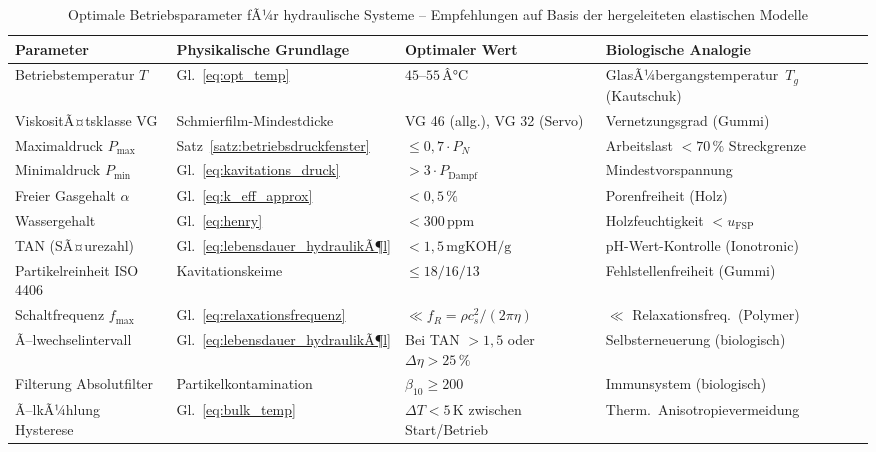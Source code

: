 ﻿\documentclass[a4paper,12pt]{scrreprt}
\theoremstyle{definition}
\begin{document}
\begin{table}[H]
  \centering
  \caption{Optimale Betriebsparameter fÃ¼r hydraulische Systeme -- Empfehlungen
    auf Basis der hergeleiteten elastischen Modelle}
  \label{tab:optimale_parameter}
  \begin{tabular}{p{4.5cm}p{3.5cm}p{3.0cm}p{2.5cm}}
    \toprule
    \textbf{Parameter}
      & \textbf{Physikalische Grundlage}
      & \textbf{Optimaler Wert}
      & \textbf{Biologische Analogie} \\
    \midrule
    Betriebstemperatur $T$
      & Gl.~\eqref{eq:opt_temp}
      & $45$--$55\,Â°\mathrm{C}$
      & GlasÃ¼bergangs\-temperatur\ $T_g$ (Kautschuk) \\[4pt]
    ViskositÃ¤tsklasse VG
      & Schmierfilm-Mindestdicke
      & VG 46 (allg.), VG 32 (Servo)
      & Vernetzungsgrad (Gummi) \\[4pt]
    Maximaldruck $P_{\max}$
      & Satz~\ref{satz:betriebsdruckfenster}
      & $\leq 0{,}7 \cdot P_N$
      & Arbeitslast $< 70\,\%$ Streckgrenze \\[4pt]
    Minimaldruck $P_{\min}$
      & Gl.~\eqref{eq:kavitations_druck}
      & $> 3 \cdot P_{\mathrm{Dampf}}$
      & Mindestvorspan\-nung \\[4pt]
    Freier Gasgehalt $\alpha$
      & Gl.~\eqref{eq:k_eff_approx}
      & $< 0{,}5\,\%$
      & Porenfreiheit (Holz) \\[4pt]
    Wassergehalt
      & Gl.~\eqref{eq:henry}
      & $< 300\,\mathrm{ppm}$
      & Holzfeuchtigkeit $< u_{\mathrm{FSP}}$ \\[4pt]
    TAN (SÃ¤urezahl)
      & Gl.~\eqref{eq:lebensdauer_hydraulikÃ¶l}
      & $< 1{,}5\,\mathrm{mgKOH/g}$
      & pH-Wert-Kontrolle (Ionotronic) \\[4pt]
    Partikelreinheit ISO 4406
      & Kavitationskeime
      & $\leq 18/16/13$
      & Fehlstellenfreiheit (Gummi) \\[4pt]
    Schaltfrequenz $f_{\max}$
      & Gl.~\eqref{eq:relaxationsfrequenz}
      & $\ll f_R = \rho c_s^2 / (2\pi\eta)$
      & $\ll$ Relaxationsfreq.\ (Polymer) \\[4pt]
    Ã–lwechselintervall
      & Gl.~\eqref{eq:lebensdauer_hydraulikÃ¶l}
      & Bei TAN $> 1{,}5$ oder $\Delta\eta > 25\,\%$
      & Selbsterneuerung (biologisch) \\[4pt]
    Filterung Absolutfilter
      & Partikelkontamination
      & $\beta_{10} \geq 200$
      & Immunsystem (biologisch) \\[4pt]
    Ã–lkÃ¼hlung Hysterese
      & Gl.~\eqref{eq:bulk_temp}
      & $\Delta T < 5\,\mathrm{K}$ zwischen Start/Betrieb
      & Therm.\ Anisotropievermeidung \\
    \bottomrule
  \end{tabular}
\end{table}
\end{document}
